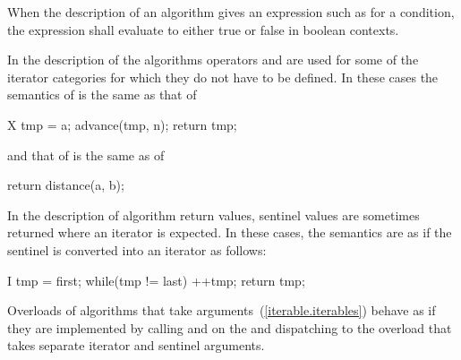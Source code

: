 \begin{removedblock}
\pnum
When the description of an algorithm gives an expression such as
for a condition, the expression shall evaluate to
either true or false in boolean contexts.
\end{removedblock}

\pnum
In the description of the algorithms operators
\tcode{+}
and
\tcode{-}
are used for some of the iterator categories for which
they do not have to be defined.
In these cases the semantics of
is the same as that of

\begin{codeblock}
X tmp = a;
advance(tmp, n);
return tmp;
\end{codeblock}

and that of
is the same as of

\begin{codeblock}
return distance(a, b);
\end{codeblock}

\begin{addedblock}
\pnum
In the description of algorithm return values, sentinel values are sometimes
returned where an iterator is expected. In these cases, the semantics are as
if the sentinel is converted into an iterator as follows:

\begin{codeblock}
I tmp = first;
while(tmp != last)
  ++tmp;
return tmp;
\end{codeblock}

\pnum
Overloads of algorithms that take  arguments~(\ref{iterable.iterables})
behave as if they are implemented by calling  and  on
the  and dispatching to the overload that takes separate
iterator and sentinel arguments.
\end{addedblock}


